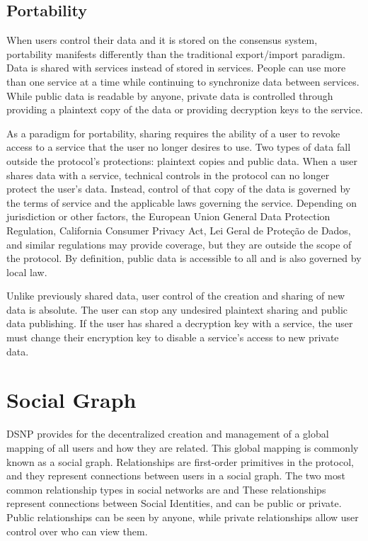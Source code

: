 \documentclass[12pt,letterpaper]{article}
\begin{document}
\subsection{Portability}\label{sec:portability}

When users control their data and it is stored on the consensus system, portability manifests
differently than the traditional export/import paradigm. Data is shared with services
instead of stored in services. People can use more than one service at a time while
continuing to synchronize data between services. While public data is readable by anyone,
private data is controlled through providing a plaintext copy of the data or providing
decryption keys to the service.

As a paradigm for portability, sharing requires the ability of a user to revoke access to a
service that the user no longer desires to use. Two types of data fall outside the
protocol's protections: plaintext copies and public data. When a user shares data with a
service, technical controls in the protocol can no longer protect the user's data.  Instead,
control of that copy of the data is governed by the terms of service and the applicable laws
governing the service. Depending on jurisdiction or other factors, the European Union
General Data Protection Regulation,\cite{gdpr2016} California Consumer Privacy
Act,\cite{ccpa2018} Lei Geral de Proteção de Dados,\cite{lgpd2019} and similar regulations
may provide coverage, but they are outside the scope of the protocol. By definition, public
data is accessible to all and is also governed by local law.

Unlike previously shared data, user control of the creation and sharing of new data is
absolute. The user can stop any undesired plaintext sharing and public data publishing. If
the user has shared a decryption key with a service, the user must change their encryption
key to disable a service's access to new private data.

\section{Social Graph}\label{sec:social_graph}

DSNP provides for the decentralized creation and management of a global mapping of all users
and how they are related. This global mapping is commonly known as a social graph.
Relationships are first-order primitives in the protocol, and they represent connections
between users in a social graph. The two most common relationship types in social networks
are  and  These relationships represent connections between Social
Identities, and can be public or private. Public relationships can be seen by anyone, while
private relationships allow user control over who can view them.
\end{document}
